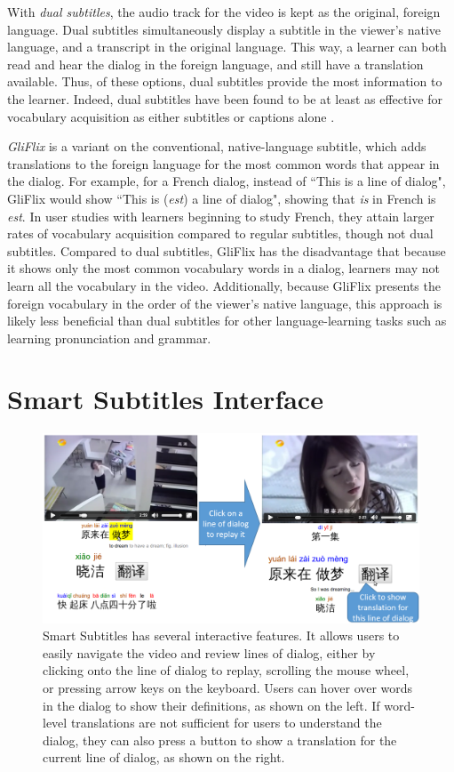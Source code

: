 \documentclass{sigchi}
\begin{document}
With \emph{dual subtitles}, the audio track for the video is kept as the original, foreign language.
Dual subtitles simultaneously display a subtitle in the viewer's native language, and a transcript in the original language. This way, a learner can both read and hear the dialog in the foreign language, and still have a translation
available. Thus, of these options, dual subtitles provide the most information to the learner.
Indeed, dual subtitles have been found to be at least as effective for vocabulary acquisition as
either subtitles or captions alone \cite{raine2012incidental}.

\emph{GliFlix} \cite{gliflix} is a variant on the conventional, native-language subtitle, which adds translations to the foreign language for the most common words that
appear in the dialog. For example, for a French dialog, instead of ``This is a line of dialog", GliFlix would show ``This is (\emph{est}) a line of dialog", showing that \emph{is} in French is \emph{est}. In user studies with learners beginning to study French, they attain larger rates of vocabulary acquisition compared to regular
subtitles, though not dual subtitles. Compared to dual subtitles, GliFlix has the disadvantage that because it shows only the most common vocabulary words in a dialog, learners may not learn all the vocabulary in the video. Additionally, because GliFlix presents the foreign vocabulary in the order of the viewer's native language, this approach is likely less beneficial than dual subtitles for
other language-learning tasks such as learning pronunciation and grammar.

\section{Smart Subtitles Interface}

\begin{figure}%
\centering
\includegraphics[width=2\columnwidth]{seekdialog-horizontal-translate}
\caption{Smart Subtitles has several interactive features. It allows users to easily navigate the video and
review lines of dialog, either by clicking onto the line of dialog to replay,
scrolling the mouse wheel,
or pressing arrow keys on the keyboard. Users can hover over words
in the dialog to show their definitions, as shown on the left.
If word-level translations are not sufficient for users to understand the dialog, they can also press a button to show a translation for the current
line of dialog, as shown on the right.}
\label{fig:figure25}
\end{figure}
\end{document}
